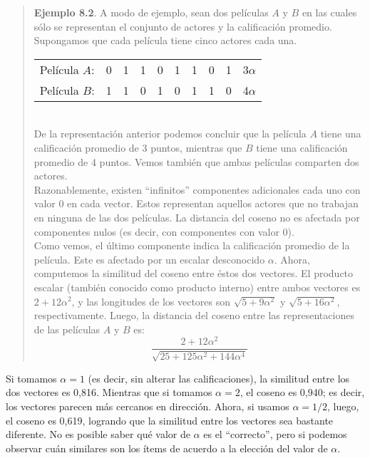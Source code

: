 				\begin{quote}
					\textbf{Ejemplo 8.2}. A modo de ejemplo, sean dos películas $A$ y $B$ en las cuales sólo se representan el conjunto de actores y la calificación promedio. Supongamos que cada película tiene cinco actores cada una.
					
					\begin{tabular}{llllllllll}
						Película $A$: & 0 & 1 & 1 & 0 & 1 & 1 & 0 & 1 & 3$\alpha$ \\
						Película $B$: & 1 & 1 & 0 & 1 & 0 & 1 & 1 & 0 & 4$\alpha$
					\end{tabular} \\	
					
					De la representación anterior podemos concluir que la película $A$ tiene una calificación promedio de 3 puntos, mientras que $B$ tiene una calificación promedio de 4 puntos. Vemos también que ambas películas comparten dos actores. \\
					
					Razonablemente, existen \enquote{infinitos} componentes adicionales cada uno con valor 0 en cada vector. Estos representan aquellos actores que no trabajan en ninguna de las dos películas. La distancia del coseno no es afectada por componentes nulos (es decir, con componentes con valor 0). \\
					
					Como vemos, el último componente indica la calificación promedio de la película. Este es afectado por un escalar desconocido $\alpha$. Ahora, computemos la similitud del coseno entre éstos dos vectores. El producto escalar (también conocido como producto interno) entre ambos vectores es $2 + 12\alpha^2$, y las longitudes de los vectores son $\sqrt{5 + 9\alpha^2}$ y $\sqrt{5 + 16\alpha^2}$, respectivamente. Luego, la distancia del coseno entre las representaciones de las películas $A$ y $B$ es:
					\begin{equation}
							\frac{2 + 12\alpha^2}{\sqrt{25 + 125\alpha^2 + 144\alpha^4}}
					\end{equation}
				\end{quote}
				
				Si tomamos $\alpha = 1$ (es decir, sin alterar las calificaciones), la similitud entre los dos vectores es 0,816. Mientras que si tomamos $\alpha = 2$, el coseno es 0,940; es decir, los vectores parecen más cercanos en dirección. Ahora, si usamos $\alpha = 1/2$, luego, el coseno es 0,619, logrando que la similitud entre los vectores sea bastante diferente. No es posible saber qué valor de $\alpha$ es el \enquote{correcto}, pero si podemos observar cuán similares son los ítems de acuerdo a la elección del valor de $\alpha$.
				
